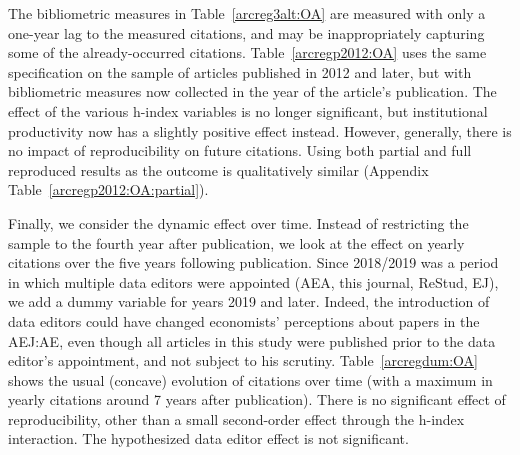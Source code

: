 


The bibliometric measures in Table~\ref{arcreg3alt:OA} are  measured with only a one-year lag to the measured citations, and may be inappropriately capturing some of the already-occurred citations. Table~\ref{arcregp2012:OA} uses the same specification on the sample of articles published in 2012 and later, but with bibliometric measures now collected in the year of the article's publication. The effect of the various h-index variables is no longer significant, but institutional productivity now has a slightly positive effect instead. However, generally, there is no impact of reproducibility on future citations. Using both partial and full reproduced results as the outcome is qualitatively similar (Appendix Table~\ref{arcregp2012:OA:partial}).



Finally, we consider the dynamic effect over time. Instead of restricting the sample to the fourth year after publication, we look at the effect on yearly citations over the  five years following publication. Since 2018/2019 was a period in which multiple data editors were appointed (AEA, this journal, ReStud, EJ), we add a dummy variable for years 2019 and later. Indeed, the introduction of data editors could have changed economists' perceptions about papers in the AEJ:AE, even though all articles in this study were published prior to the data editor's appointment, and not subject to his scrutiny.
Table~\ref{arcregdum:OA} shows the usual (concave) evolution of citations over time (with a maximum in yearly citations around 7 years after publication). There is no significant effect of reproducibility, other than a small second-order effect through the h-index interaction. The hypothesized data editor effect is not significant.





